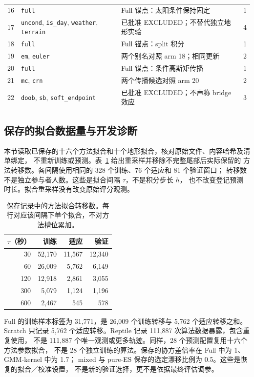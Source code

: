\documentclass[UTF8,11pt]{ctexart}
\begin{document}
{\begin{longtable}{p{.06\linewidth}p{.36\linewidth}p{.43\linewidth}r}
16 & \texttt{full} & Full 锚点：太阳条件保持固定 & 1\\
17 & \texttt{uncond}, \texttt{is\_day}, \texttt{weather}, \texttt{terrain} & 已批准 EXCLUDED；不替代独立地形实验 & 4\\
18 & \texttt{full} & Full 锚点：split 积分 & 1\\
19 & \texttt{em}, \texttt{euler} & 两个别名对照 arm 18；相同更新 & 2\\
20 & \texttt{full} & Full 锚点：条件高斯矩传播 & 1\\
21 & \texttt{mc}, \texttt{crn} & 两个传播候选对照 arm 20 & 2\\
22 & \texttt{doob}, \texttt{sb}, \texttt{soft\_endpoint} & 已批准 EXCLUDED；不声称 bridge 效应 & 3\\
\end{longtable}
}

\subsection{保存的拟合数据量与开发诊断}
\label{sec:saved-fit-diagnostics}
本节读取已保存的十六个方法拟合和十个地形拟合，核对原始文件、内容哈希及清单绑定，
不重新训练或预测。表~\ref{tab:fit-transition-counts} 给出重采样并移除不完整尾部后实际保留的
方法转移数。各间隔使用相同的 328 个训练、76 个适应和 81 个验证窗口；
转移数不是独立参与者人数。这些是拟合间隔 \(\tau\)，不是积分步长 \(h\)，
也不改变登记预测时长。拟合重采样没有改变原始评分观测。

\begin{table}[htbp]
\centering\small
\caption{保存记录中的方法拟合转移数。每行对应该间隔下单个拟合，不对方法槽位累加。}
\label{tab:fit-transition-counts}
\begin{tabular}{rrrr}
\toprule
\(\tau\)（秒） & 训练 & 适应 & 验证\\
\midrule
30 & 52,170 & 11,567 & 12,340\\
60 & 26,009 & 5,762 & 6,149\\
120 & 12,918 & 2,861 & 3,055\\
300 & 5,079 & 1,124 & 1,196\\
600 & 2,467 & 545 & 578\\
\bottomrule
\end{tabular}
\end{table}

Full 的训练样本标签为 31,771，是 26,009 个训练转移与 5,762 个适应转移之和。
Scratch 只记录 5,762 个适应转移。Reptile 记录 111,887 次算法数据暴露，包含重复使用，
不是 111,887 个唯一观测或更多轨迹。同样，28 个预测配置复用十六个方法参数拟合，
不是 28 个独立训练的算法。保存的协方差倍率在 Full 中为 1、GMM-kernel 中为 1.7；
mixed 与 pure-ES 保存的选定漂移比例为 0.5。这些是恢复的拟合／校准设置，
不是新的验证选择，更不是依据最终评估调参。
\end{document}
